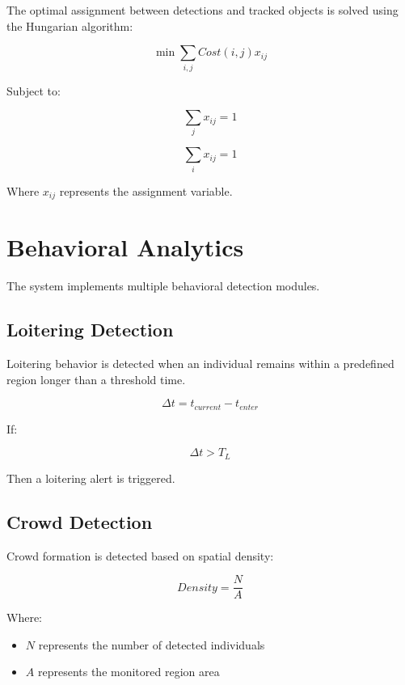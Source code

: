 \documentclass[conference]{IEEEtran}
\begin{document}
The optimal assignment between detections and tracked objects is solved using the Hungarian algorithm:

\begin{equation}
\min \sum_{i,j} Cost(i,j) x_{ij}
\end{equation}

Subject to:

\begin{equation}
\sum_j x_{ij} = 1
\end{equation}

\begin{equation}
\sum_i x_{ij} = 1
\end{equation}

Where $x_{ij}$ represents the assignment variable.

\section{Behavioral Analytics}

The system implements multiple behavioral detection modules.

\subsection{Loitering Detection}

Loitering behavior is detected when an individual remains within a predefined region longer than a threshold time.

\begin{equation}
\Delta t = t_{current} - t_{enter}
\end{equation}

If:

\begin{equation}
\Delta t > T_L
\end{equation}

Then a loitering alert is triggered.

\subsection{Crowd Detection}

Crowd formation is detected based on spatial density:

\begin{equation}
Density = \frac{N}{A}
\end{equation}

Where:

\begin{itemize}
\item $N$ represents the number of detected individuals
\item $A$ represents the monitored region area
\end{itemize}
\end{document}
